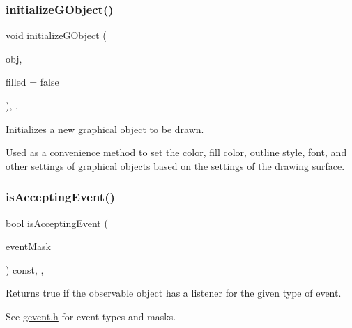 \subsubsection{\texorpdfstring{initialize\+G\+Object()}{initializeGObject()}\hspace{0.1cm}{\footnotesize\ttfamily [2/2]}}
{\footnotesize\ttfamily void initialize\+G\+Object (\begin{DoxyParamCaption}\item[{\mbox{\hyperlink{classGObject}{G\+Object}} $\ast$}]{obj,  }\item[{bool}]{filled = {\ttfamily false} }\end{DoxyParamCaption})\hspace{0.3cm}{\ttfamily [protected]}, {\ttfamily [virtual]}, {\ttfamily [inherited]}}



Initializes a new graphical object to be drawn. 

Used as a convenience method to set the color, fill color, outline style, font, and other settings of graphical objects based on the settings of the drawing surface. \mbox{\label{classGObservable_aeec1adc19aa0f33de62390686ee1382c}} 
\subsubsection{\texorpdfstring{is\+Accepting\+Event()}{isAcceptingEvent()}\hspace{0.1cm}{\footnotesize\ttfamily [1/3]}}
{\footnotesize\ttfamily bool is\+Accepting\+Event (\begin{DoxyParamCaption}\item[{int}]{event\+Mask }\end{DoxyParamCaption}) const\hspace{0.3cm}{\ttfamily [protected]}, {\ttfamily [virtual]}, {\ttfamily [inherited]}}



Returns true if the observable object has a listener for the given type of event. 

See \mbox{\hyperlink{gevent_8h_source}{gevent.\+h}} for event types and masks. \mbox{\label{classGObservable_aa31c73145a29dcb92848a92e0cfaea41}} 
